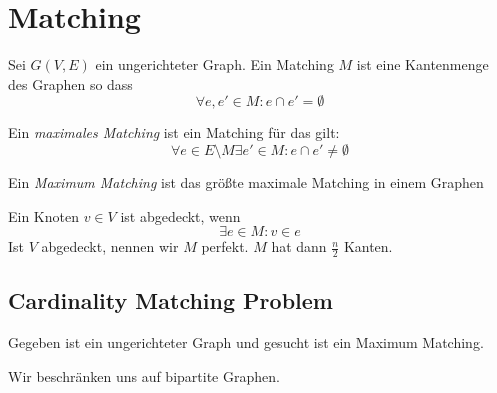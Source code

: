\documentclass{mycourse}
\begin{document}
\section{Matching}

\begin{df}
Sei $G(V,E)$ ein ungerichteter Graph.
Ein Matching $M$ ist eine Kantenmenge des Graphen so dass
\[
\forall e,e'\in M : e \cap e' = \emptyset
\]
\end{df}
\begin{df}
Ein \emph{maximales Matching} ist ein Matching für das gilt:
\[
\forall e\in E\setminus M \exists e'\in M: e\cap e'\neq \emptyset
\]
\end{df}
\begin{df}
Ein \emph{Maximum Matching} ist das größte maximale Matching in einem Graphen
\end{df}
\begin{df}
Ein Knoten $v\in V$ ist abgedeckt, wenn
\[
\exists e\in M : v\in e
\]
Ist $V$ abgedeckt, nennen wir $M$ perfekt.
$M$ hat dann $\frac n2$ Kanten.
\end{df}

\subsection{Cardinality Matching Problem}
Gegeben ist ein ungerichteter Graph und gesucht ist ein Maximum Matching.

Wir beschränken uns auf bipartite Graphen.
\end{document}
